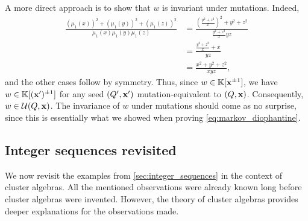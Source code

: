 \begin{example}
	A more direct approach is to show that $w$ is invariant under mutations. Indeed,
	\begin{align*}
		\frac{(\mu_1(x))^2 + (\mu_1(y))^2 + (\mu_1(z))^2}{\mu_1(x)\mu_1(y)\mu_1(z)}
		 & = \frac{\left(\frac{y^2 + z^2}{x}\right)^2 + y^2 + z^2}{\frac{y^2 + z^2}{x}yz} \\
		 & = \frac{\frac{y^2 + z^2}{x} + x}{yz}                                           \\
		 & = \frac{x^2 + y^2 + z^2}{xyz},
	\end{align*}
	and the other cases follow by symmetry. Thus, since $w \in \mathbb{K}[\mathbf{x}^{\pm 1}]$, we have
	$w \in \mathbb{K}[(\mathbf{x}')^{\pm 1}]$ for any seed $(Q', \mathbf{x}')$ mutation-equivalent to $(Q,
		\mathbf{x})$. Consequently, $w \in \mathcal{U}(Q, \mathbf{x})$. The invariance of $w$ under mutations should
	come as no surprise, since this is essentially what we showed when proving
	\cref{eq:markov_diophantine}.
\end{example}

\subsection{Integer sequences revisited}\label{sec:sequences_revisited}

We now revisit the examples from \cref{sec:integer_sequences} in the context of cluster
algebras. All the mentioned observations were already known long before cluster
algebras were invented. However, the theory of cluster algebras provides deeper
explanations for the observations made.

